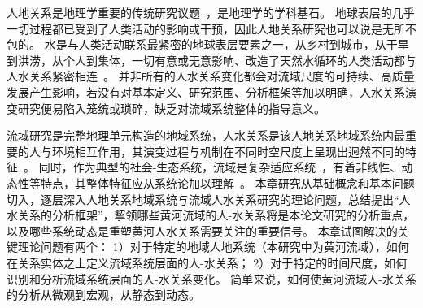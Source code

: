 
人地关系是地理学重要的传统研究议题~\cite{zhang2022c}，是地理学的学科基石。
地球表层的几乎一切过程都已受到了人类活动的影响或干预，因此人地关系研究也可以说是无所不包的。
水是与人类活动联系最紧密的地球表层要素之一，从乡村到城市，从干旱到洪涝，从个人到集体，一切有意或无意影响、改造了天然水循环的人类活动都与人水关系紧密相连~\cite{falkenmark2021}。
并非所有的人水关系变化都会对流域尺度的可持续、高质量发展产生影响，若没有对基本定义、研究范围、分析框架等加以明确，人水关系演变研究便易陷入笼统或琐碎，缺乏对流域系统整体的指导意义。

流域研究是完整地理单元构造的地域系统，人水关系是该人地关系地域系统内最重要的人与环境相互作用，其演变过程与机制在不同时空尺度上呈现出迥然不同的特征~\cite{wang2019d}。
同时，作为典型的社会-生态系统，流域是复杂适应系统~\cite{huggins2022}，有着非线性、动态性等特点，其整体特征应从系统论加以理解~\cite{reyers2018}。
本章研究从基础概念和基本问题切入，逐层深入人地关系地域系统与流域人水关系研究的理论问题，总结提出“人水关系的分析框架”，挈领哪些黄河流域的人-水关系将是本论文研究的分析重点，以及哪些系统动态是重塑黄河人水关系需要关注的重要信号。
本章试图解决的关键理论问题有两个：
1）对于特定的地域人地系统（本研究中为黄河流域），如何在关系实体之上定义流域系统层面的人-水关系；
2）对于特定的时间尺度，如何识别和分析流域系统层面的人-水关系变化。
简单来说，如何使黄河流域人-水关系的分析从微观到宏观，从静态到动态。
